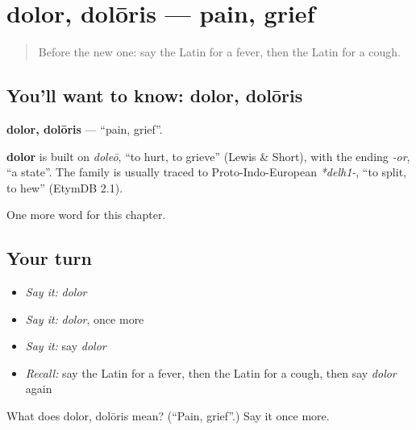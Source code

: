\section[dolor, dolōris]{dolor, dolōris — pain, grief}

\label{lesson:LA-C67-dolor}



\begin{quote}
Before the new one: say the Latin for a fever, then the Latin for a cough.
\end{quote}

\subsection*{You'll want to know: dolor, dolōris}
\textbf{dolor, dolōris} — \textquotedblleft{}pain, grief\textquotedblright{}.

\begin{cousinweb}
\textbf{dolor} is built on \emph{doleō}, \textquotedblleft{}to hurt, to grieve\textquotedblright{} (Lewis \& Short), with the ending \emph{-or}, \textquotedblleft{}a state\textquotedblright{}. The family is usually traced to Proto-Indo-European \emph{*delh1-}, \textquotedblleft{}to split, to hew\textquotedblright{} (EtymDB 2.1).
\end{cousinweb}

\begin{grammarlens}[title={What you've built}]
One more word for this chapter.
\end{grammarlens}

\subsection*{Your turn}
\begin{itemize}
\raggedright
  \item \emph{Say it:} \emph{dolor}
  \item \emph{Say it:} \emph{dolor}, once more
  \item \emph{Say it:} say \emph{dolor}
  \item \emph{Recall:} say the Latin for a fever, then the Latin for a cough, then say \emph{dolor} again
\end{itemize}

\begin{tcolorbox}[breakable,colback=teal!4,colframe=teal!35!black,title={Before you move on}]
What does dolor, dolōris mean? (\textquotedblleft{}Pain, grief\textquotedblright{}.) Say it once more.
\end{tcolorbox}
